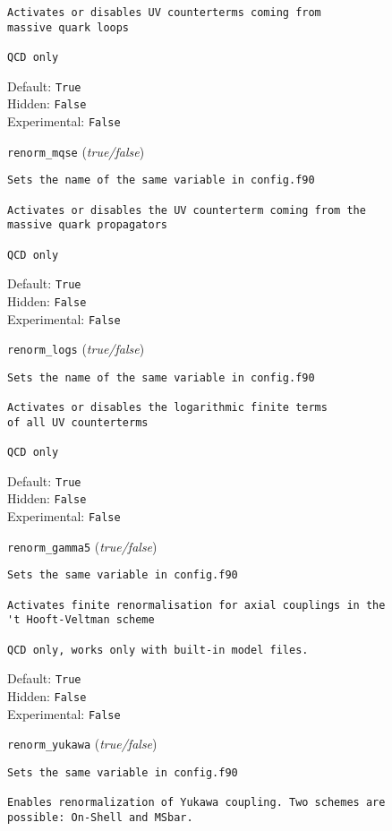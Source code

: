 \begin{basedescript}{\desclabelstyle{\pushlabel}}
\begin{verbatim}
Activates or disables UV counterterms coming from
massive quark loops

QCD only
\end{verbatim}
Default: \verb|True|
\\Hidden: \verb|False|
\\Experimental: \verb|False|
\\\item[\colorbox{gray!30}{\texttt{renorm\_mqse}}] (\textit{true/false})
\begin{verbatim}
Sets the name of the same variable in config.f90

Activates or disables the UV counterterm coming from the
massive quark propagators

QCD only
\end{verbatim}
Default: \verb|True|
\\Hidden: \verb|False|
\\Experimental: \verb|False|
\\\item[\colorbox{gray!30}{\texttt{renorm\_logs}}] (\textit{true/false})
\begin{verbatim}
Sets the name of the same variable in config.f90

Activates or disables the logarithmic finite terms
of all UV counterterms

QCD only
\end{verbatim}
Default: \verb|True|
\\Hidden: \verb|False|
\\Experimental: \verb|False|
\\\item[\colorbox{gray!30}{\texttt{renorm\_gamma5}}] (\textit{true/false})
\begin{verbatim}
Sets the same variable in config.f90

Activates finite renormalisation for axial couplings in the
't Hooft-Veltman scheme

QCD only, works only with built-in model files.
\end{verbatim}
Default: \verb|True|
\\Hidden: \verb|False|
\\Experimental: \verb|False|
\\\item[\colorbox{gray!30}{\texttt{renorm\_yukawa}}] (\textit{true/false})
\begin{verbatim}
Sets the same variable in config.f90

Enables renormalization of Yukawa coupling. Two schemes are
possible: On-Shell and MSbar.


\end{verbatim}
\end{basedescript}

